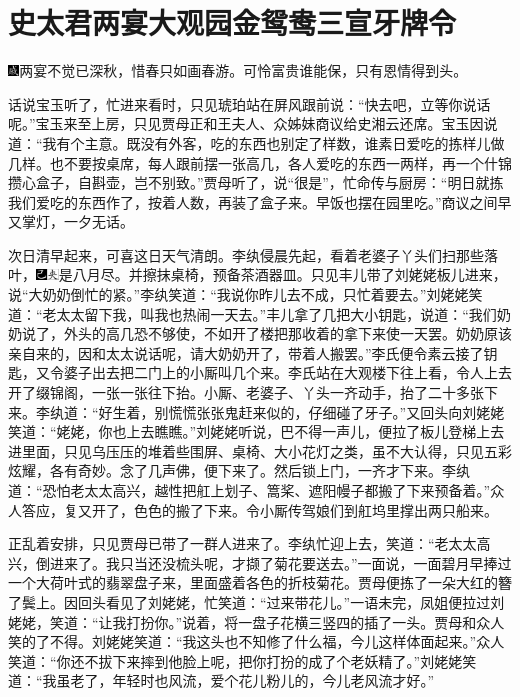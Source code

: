 

\chapter{史太君两宴大观园\hspace{.5em}金鸳鸯三宣牙牌令}
{\includegraphics[width=3mm]{../Images/00005}两宴不觉已深秋，惜春只如画春游。可怜富贵谁能保，只有恩情得到头。}

话说宝玉听了，忙进来看时，只见琥珀站在屏风跟前说：``快去吧，立等你说话呢。''宝玉来至上房，只见贾母正和王夫人、众姊妹商议给史湘云还席。宝玉因说道：``我有个主意。既没有外客，吃的东西也别定了样数，谁素日爱吃的拣样儿做几样。也不要按桌席，每人跟前摆一张高几，各人爱吃的东西一两样，再一个什锦攒心盒子，自斟壶，岂不别致。''贾母听了，说``很是''，忙命传与厨房：``明日就拣我们爱吃的东西作了，按着人数，再装了盒子来。早饭也摆在园里吃。''商议之间早又掌灯，一夕无话。

次日清早起来，可喜这日天气清朗。李纨侵晨先起，看着老婆子丫头们扫那些落叶，{\includegraphics[width=3mm]{../Images/00003}\includegraphics[width=3mm]{../Images/00012}\footnotesize \kaishu 是八月尽。}并擦抹桌椅，预备茶酒器皿。只见丰儿带了刘姥姥板儿进来，说``大奶奶倒忙的紧。''李纨笑道：``我说你昨儿去不成，只忙着要去。''刘姥姥笑道：``老太太留下我，叫我也热闹一天去。''丰儿拿了几把大小钥匙，说道：``我们奶奶说了，外头的高几恐不够使，不如开了楼把那收着的拿下来使一天罢。奶奶原该亲自来的，因和太太说话呢，请大奶奶开了，带着人搬罢。''李氏便令素云接了钥匙，又令婆子出去把二门上的小厮叫几个来。李氏站在大观楼下往上看，令人上去开了缀锦阁，一张一张往下抬。小厮、老婆子、丫头一齐动手，抬了二十多张下来。李纨道：``好生着，别慌慌张张鬼赶来似的，仔细碰了牙子。''又回头向刘姥姥笑道：``姥姥，你也上去瞧瞧。''刘姥姥听说，巴不得一声儿，便拉了板儿登梯上去进里面，只见乌压压的堆着些围屏、桌椅、大小花灯之类，虽不大认得，只见五彩炫耀，各有奇妙。念了几声佛，便下来了。然后锁上门，一齐才下来。李纨道：``恐怕老太太高兴，越性把舡上划子、篙桨、遮阳幔子都搬了下来预备着。''众人答应，复又开了，色色的搬了下来。令小厮传驾娘们到舡坞里撑出两只船来。

正乱着安排，只见贾母已带了一群人进来了。李纨忙迎上去，笑道：``老太太高兴，倒进来了。我只当还没梳头呢，才撷了菊花要送去。''一面说，一面碧月早捧过一个大荷叶式的翡翠盘子来，里面盛着各色的折枝菊花。贾母便拣了一朵大红的簪了鬓上。因回头看见了刘姥姥，忙笑道：``过来带花儿。''一语未完，凤姐便拉过刘姥姥，笑道：``让我打扮你。''说着，将一盘子花横三竖四的插了一头。贾母和众人笑的了不得。刘姥姥笑道：``我这头也不知修了什么福，今儿这样体面起来。''众人笑道：``你还不拔下来摔到他脸上呢，把你打扮的成了个老妖精了。''刘姥姥笑道：``我虽老了，年轻时也风流，爱个花儿粉儿的，今儿老风流才好。''

